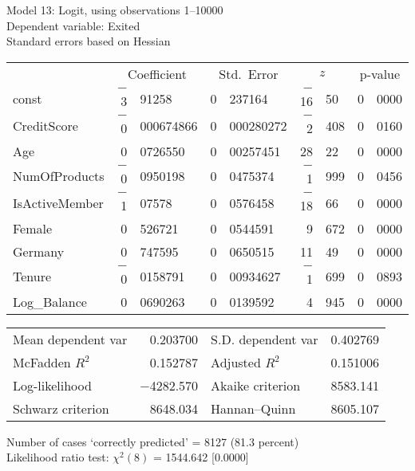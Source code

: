 \documentclass[11pt]{article}
\begin{document}
\thispagestyle{empty}

\begin{center}

Model 13: Logit, using observations 1--10000\\
Dependent variable: Exited\\
Standard errors based on Hessian

\vspace{1em}

\begin{tabular}{lr@{.}lr@{.}lr@{.}lr@{.}l}
  &
 \multicolumn{2}{c}{Coefficient} &
  \multicolumn{2}{c}{Std.\ Error} &
   \multicolumn{2}{c}{$z$} &
    \multicolumn{2}{c}{p-value} \\[1ex]
const &
  $-$3&91258 &
    0&237164 &
      $-$16&50 &
        0&0000 \\
CreditScore &
  $-$0&000674866 &
    0&000280272 &
      $-$2&408 &
        0&0160 \\
Age &
  0&0726550 &
    0&00257451 &
      28&22 &
        0&0000 \\
NumOfProducts &
  $-$0&0950198 &
    0&0475374 &
      $-$1&999 &
        0&0456 \\
IsActiveMember &
  $-$1&07578 &
    0&0576458 &
      $-$18&66 &
        0&0000 \\
Female &
  0&526721 &
    0&0544591 &
      9&672 &
        0&0000 \\
Germany &
  0&747595 &
    0&0650515 &
      11&49 &
        0&0000 \\
Tenure &
  $-$0&0158791 &
    0&00934627 &
      $-$1&699 &
        0&0893 \\
Log\_Balance &
  0&0690263 &
    0&0139592 &
      4&945 &
        0&0000 \\
\end{tabular}

\vspace{1ex}
\begin{tabular}{lrlr}
Mean dependent var &  0.203700 & S.D. dependent var &  0.402769 \\
McFadden $R^2$ &  0.152787 & Adjusted $R^2$ &  0.151006 \\
Log-likelihood & $-$4282.570 & Akaike criterion &  8583.141 \\
Schwarz criterion &  8648.034 & Hannan--Quinn &  8605.107 \\
\end{tabular}


\vspace{1ex}
\vspace{1em}
\begin{raggedright}
Number of cases `correctly predicted' = 8127 (81.3 percent)\\
Likelihood ratio test: $\chi^2(8)$ = 1544.642 [0.0000]\\
\end{raggedright}

\end{center}
\end{document}
